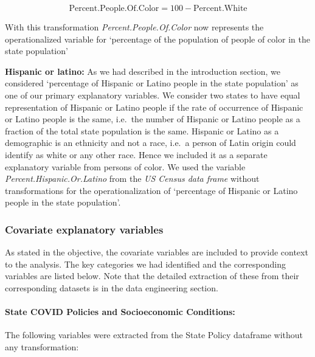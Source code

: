 \documentclass[
]{article}
\begin{document}
\[
\text{Percent.People.Of.Color} = 100 -\text{Percent.White}
\]

With this transformation \emph{Percent.People.Of.Color} now represents
the operationalized variable for `percentage of the population of people
of color in the state population'

\textbf{Hispanic or latino:} As we had described in the introduction
section, we considered `percentage of Hispanic or Latino people in the
state population' as one of our primary explanatory variables. We
consider two states to have equal representation of Hispanic or Latino
people if the rate of occurrence of Hispanic or Latino people is the
same, i.e.~the number of Hispanic or Latino people as a fraction of the
total state population is the same. Hispanic or Latino as a demographic
is an ethnicity and not a race, i.e.~a person of Latin origin could
identify as white or any other race. Hence we included it as a separate
explanatory variable from persons of color. We used the variable
\emph{Percent.Hispanic.Or.Latino} from the \emph{US Census data frame}
without transformations for the operationalization of `percentage of
Hispanic or Latino people in the state population'.

\hypertarget{covariate-explanatory-variables}{%
\subsubsection{Covariate explanatory
variables}\label{covariate-explanatory-variables}}

As stated in the objective, the covariate variables are included to
provide context to the analysis. The key categories we had identified
and the corresponding variables are listed below. Note that the detailed
extraction of these from their corresponding datasets is in the data
engineering section.

\hypertarget{state-covid-policies-and-socioeconomic-conditions}{%
\paragraph{\texorpdfstring{State COVID Policies and Socioeconomic
Conditions:\\
}{State COVID Policies and Socioeconomic Conditions: }}\label{state-covid-policies-and-socioeconomic-conditions}}

The following variables were extracted from the State Policy dataframe
without any transformation:
\end{document}
